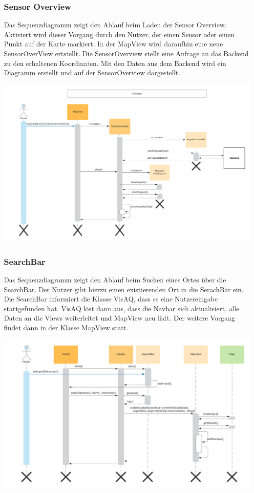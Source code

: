 \subsubsection{Sensor Overview}
\label{Screenshots}
 Das Sequenzdiagramm zeigt den Ablauf beim Laden der Sensor Overview. Aktiviert wird dieser Vorgang durch den Nutzer, der einen Sensor oder einen Punkt auf der Karte markiert. In der MapView wird daraufhin eine neue SensorOverView ertstellt. Die SensorOverview stellt eine Anfrage an das Backend zu den erhaltenen Koordinaten. Mit den Daten aus dem Backend wird ein Diagramm erstellt und auf der SensorOverview dargestellt.
\begin{center}
	\includegraphics[width=1\textwidth]{media/frontend/sequence-diagram/sequenceSensorOverView.png} 
\end{center}
\clearpage %
\subsubsection{SearchBar}
\label{Screenshots}
Das Sequenzdiagramm zeigt den Ablauf beim Suchen eines Ortes über die SearchBar. Der Nutzer gibt hierzu einen existierenden Ort in die SerachBar ein. Die SearchBar informiert die Klasse VisAQ, dass es eine Nutzereingabe stattgefunden hat. VisAQ löst dann aus, dass die Navbar sich aktualisiert, alle Daten an die Views weiterleitet und MapView neu lädt. Der weitere Vorgang findet dann in der Klasse MapView statt.
\begin{center}
	\includegraphics[width=1\textwidth]{media/frontend/sequence-diagram/sequenceSearchbar.png} 
\end{center}
\clearpage %
